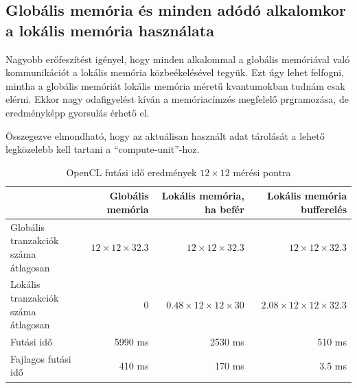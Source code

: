 \subsection{Globális memória és minden adódó alkalomkor a lokális memória használata}
	Nagyobb erőfeszítést igényel, hogy minden alkalommal a globális memóriával való kommunikációt a
	lokális memória közbeékelésével tegyük.
	Ezt úgy lehet felfogni, mintha a globális memóriát lokális memória méretű
	kvantumokban tudnám csak elérni.
	Ekkor nagy odafigyelést kíván a memóriacímzés megfelelő prgramozása, de
	eredményképp gyorsulás érhető el. \\
	
	\noindent
	\begin{center}
	Összegezve elmondható, hogy az aktuálisan használt adat tárolását a lehető
	legközelebb kell tartani a ``compute-unit''-hoz.
	\end{center}
	
	\begin{table}[!Ht]
		\caption{OpenCL futási idő eredmények $12\times12$ mérési pontra}
		\label{table:openresult}
		\centering
		\begin{tabular}{l|r|r|r}
		 & Globális memória & Lokális memória, ha befér & Lokális memória bufferelés\\ \hline
		\parbox{2.5cm}{Globális tranzakciók száma átlagosan} & $12 \times 12\times 32.3$
		& $12 \times 12 \times 32.3$ & $12 \times 12 \times 32.3$\\
		\parbox{2.5cm}{Lokális tranzakciók száma átlagosan} & 0 &
		$0.48 \times 12 \times 12 \times 30$ & $2.08 \times 12 \times12 \times 32.3$\\
		Futási idő & 5990 ms & 2530 ms & 510 ms\\
		Fajlagos futási idő & 410 ms & 170 ms & 3.5 ms 
		\end{tabular}
	\end{table}
	